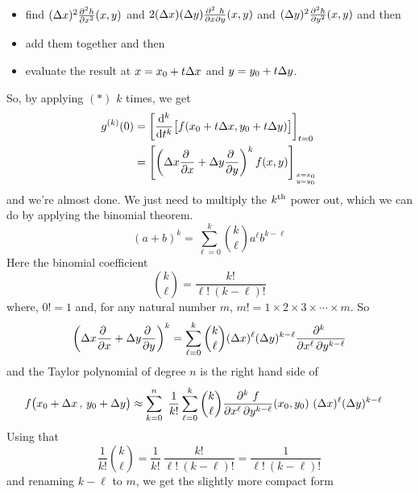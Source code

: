{\begin{itemize}
(using that $\frac{\partial^2\ h}{\partial x\partial y}
             =\frac{\partial^2\ h}{\partial y\partial x}$)
and then 
\item 
find $(\Delta x)^2\frac{\partial^2 h}{\partial x^2}(x,y)$ and  
   $2(\Delta x)(\Delta y)\frac{\partial^2\ h}{\partial x\partial y}(x,y)$ and
   $(\Delta y)^2\frac{\partial^2 h}{\partial y^2}(x,y)$ and then
\item
add them together and then
\item
evaluate the result at $x =  x_0 + t\Delta x$ and $y= y_0 + t\Delta y$.
\end{itemize}
So, by applying $(*)$ $k$ times, we get
\begin{align*}
g^{(k)}(0)
&=\left[\frac{\dee{}^k}{\dee{t}^k} \big[f(x_0 + t\De x , y_0 + t\De y)\big]
     \right]_{t=0} \\
&=\left[\left(\De x\pdiff{}{x} +\De y\pdiff{}{y}\right)^k f(x,y)\right]_{
                 \Atop{x =  x_0}{y= y_0}}
\end{align*}
and we're almost done. We just need to multiply the $k^{\rm th}$ power out,
which we can do by applying the binomial theorem.
\begin{equation*}
(a+b)^k = \sum_{\ell=0}^{k} \binom{k}{\ell} a^\ell b^{k-\ell}
\end{equation*}
Here the binomial coefficient
\begin{equation*}
\binom{k}{\ell} =\frac{k!}{\ell!\ (k-\ell)!} 
\end{equation*}
where, $0!=1$ and, for any natural number $m$, 
   $m! =1\times 2\times 3\times \cdots\times m$.  
So
\begin{equation*}
\left(\De x\pdiff{}{x} +\De y\pdiff{}{y}\right)^k
=\sum_{\ell=0}^{k} \binom{k}{\ell} (\De x)^\ell (\De y)^{k-\ell}
         \frac{\partial^k\ }{\partial x^\ell\,\partial y^{k-\ell}}
\end{equation*}
and the Taylor polynomial of degree $n$ is the right hand side of
\begin{align*}
f\big(x_0 + \Delta x\,,\,y_0+\Delta y\big)
&\approx \sum_{k=0}^n\ \frac{1}{k!} 
    \sum_{\ell=0}^{k} \binom{k}{\ell} 
         \frac{\partial^k\ f}{\partial x^\ell\,\partial y^{k-\ell}}(x_0,y_0)
         \ (\Delta x)^\ell (\Delta y)^{k-\ell}
\end{align*}
Using that 
\begin{equation*}
\frac{1}{k!} \binom{k}{\ell}
=\frac{1}{k!}\ \frac{k!}{\ell!\ (k-\ell)!} 
=\frac{1}{\ell!\ (k-\ell)!} 
\end{equation*}
and renaming $k-\ell$ to $m$, we get the slightly more compact form
}
